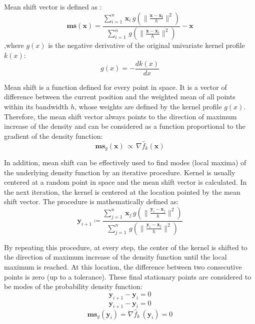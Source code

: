 Mean shift vector is defined as \citep{Comaniciu2002}:
\begin{equation} \label{eq:3-A8}
\mathbf{ms} (\mathbf{x}) = 
\frac{\sum_{i=1}^n \, \mathbf{x}_i \, g (\parallel  \frac{\mathbf{x}-\mathbf{x_i}}{h} \parallel^2) }{\sum_{i=1}^n \, g (\parallel  \frac{\mathbf{x}-\mathbf{x}_i}{h} \parallel^2)} - \mathbf{x}
\end{equation}
,where $g(x)$ is the negative derivative of the original univariate kernel profile $k(x)$:
\begin{equation} \label{eq:3-A9}
g(x) = - \frac{dk(x)}{dx}
\end{equation}

Mean shift is a function defined for every point in space. It is a vector of difference between the current position and the weighted mean of all points within its bandwidth $h$, whose weights are defined by the kernel profile $g(x)$. Therefore, the mean shift vector always points to the direction of maximum increase of the density and can be considered as a function proportional to the gradient of the density function:
\begin{equation} \label{eq:3-A10}
\mathbf{ms}_g (\mathbf{x}) \, \propto \, \nabla \hat{f}_k (\mathbf{x})
\end{equation}

In addition, mean shift can be effectively used to find modes (local maxima) of the underlying density function by an iterative procedure. Kernel is usually centered at a random point in space and the mean shift vector is calculated. In the next iteration, the kernel is centered at the location pointed by the mean shift vector. The procedure is mathematically defined as:
\begin{equation} \label{eq:3-A11}
\mathbf{y}_{i+1} \coloneqq 
\frac{\sum_{j=1}^n \, \mathbf{x}_j \, g (\parallel \frac{\mathbf{y}_i-\mathbf{x}_j}{h} \parallel^2) }
{\sum_{j=1}^n \, g (\parallel  \frac{\mathbf{y}_i-\mathbf{x}_j}{h} \parallel^2)}
\end{equation}

By repeating this procedure, at every step, the center of the kernel is shifted to the direction of maximum increase of the density function until the local maximum is reached. At this location, the difference between two consecutive points is zero (up to a tolerance). These final stationary points are considered to be modes of the probability density function:
\begin{equation} \label{eq:3-A12}
\mathbf{y}_{i+1} - \mathbf{y}_i = 0
\end{equation}
\begin{equation} \label{eq:3-A12}
\mathbf{y}_{i+1} - \mathbf{y}_i = 0
\end{equation}
\begin{equation} \label{eq:3-A13}
\mathbf{ms}_g (\mathbf{y}_{i}) = \nabla \hat{f}_k \, (\mathbf{y}_i) = 0
\end{equation}

